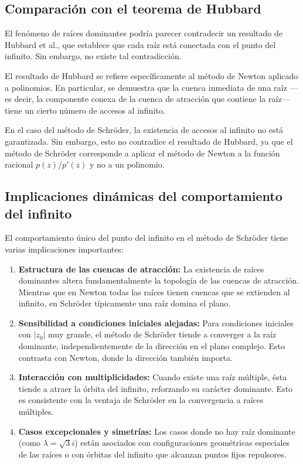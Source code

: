 \subsection{Comparación con el teorema de Hubbard}

El fenómeno de raíces dominantes podría parecer contradecir un resultado de Hubbard et al., que establece que cada raíz está conectada con el punto del infinito. Sin embargo, no existe tal contradicción.

El resultado de Hubbard se refiere específicamente al método de Newton aplicado a polinomios. En particular, se demuestra que la cuenca inmediata de una raíz ---es decir, la componente conexa de la cuenca de atracción que contiene la raíz--- tiene un cierto número de accesos al infinito.

En el caso del método de Schröder, la existencia de accesos al infinito no está garantizada. Sin embargo, esto no contradice el resultado de Hubbard, ya que el método de Schröder corresponde a aplicar el método de Newton a la función racional $p(z)/p'(z)$ y no a un polinomio.

\subsection{Implicaciones dinámicas del comportamiento del infinito}

El comportamiento único del punto del infinito en el método de Schröder tiene varias implicaciones importantes:

\begin{enumerate}
\item \textbf{Estructura de las cuencas de atracción:} La existencia de raíces dominantes altera fundamentalmente la topología de las cuencas de atracción. Mientras que en Newton todas las raíces tienen cuencas que se extienden al infinito, en Schröder típicamente una raíz domina el plano.

\item \textbf{Sensibilidad a condiciones iniciales alejadas:} Para condiciones iniciales con $|z_0|$ muy grande, el método de Schröder tiende a converger a la raíz dominante, independientemente de la dirección en el plano complejo. Esto contrasta con Newton, donde la dirección también importa.

\item \textbf{Interacción con multiplicidades:} Cuando existe una raíz múltiple, ésta tiende a atraer la órbita del infinito, reforzando su carácter dominante. Esto es consistente con la ventaja de Schröder en la convergencia a raíces múltiples.

\item \textbf{Casos excepcionales y simetrías:} Los casos donde no hay raíz dominante (como $\lambda=\sqrt{3}i$) están asociados con configuraciones geométricas especiales de las raíces o con órbitas del infinito que alcanzan puntos fijos repulsores.
\end{enumerate}

